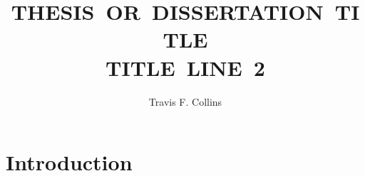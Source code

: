 \documentclass[11pt]{mvlthesis}
\title{\scshape \mbox{THESIS OR DISSERTATION TITLE}\\
\scshape \mbox{TITLE LINE 2}}
\author{Travis F. Collins}
\begin{document}
\maketitle
\begin{abstract}



\end{abstract}


\begin{frontmatter}

\begin{acknowledgements}
\end{acknowledgements}
\tableofcontents
\listoffigures
\listoftables

\end{frontmatter}



\chapter{Introduction}
\label{ch:introduction}

%


%


%










%


\end{document}
